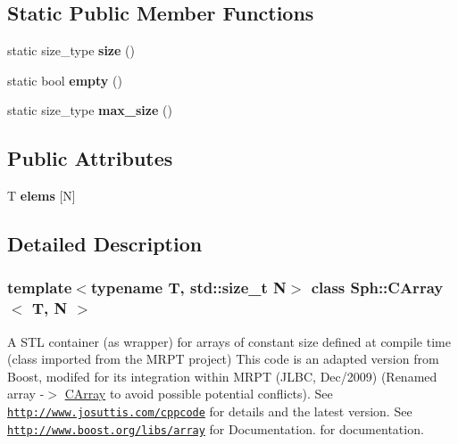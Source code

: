 \subsection*{Static Public Member Functions}
\begin{DoxyCompactItemize}
\item 
\hypertarget{classSph_1_1CArray_a03e1155a64fd175ea52366b3556e7e3d}{}\label{classSph_1_1CArray_a03e1155a64fd175ea52366b3556e7e3d} 
static size\+\_\+type {\bfseries size} ()
\item 
\hypertarget{classSph_1_1CArray_a321aeb07b35cf7aa7da72162ab9d2198}{}\label{classSph_1_1CArray_a321aeb07b35cf7aa7da72162ab9d2198} 
static bool {\bfseries empty} ()
\item 
\hypertarget{classSph_1_1CArray_af82316e045b35b616d6d585e1130c38b}{}\label{classSph_1_1CArray_af82316e045b35b616d6d585e1130c38b} 
static size\+\_\+type {\bfseries max\+\_\+size} ()
\end{DoxyCompactItemize}
\subsection*{Public Attributes}
\begin{DoxyCompactItemize}
\item 
\hypertarget{classSph_1_1CArray_a5843f925025a4873fd098667d291a51e}{}\label{classSph_1_1CArray_a5843f925025a4873fd098667d291a51e} 
T {\bfseries elems} \mbox{[}N\mbox{]}
\end{DoxyCompactItemize}


\subsection{Detailed Description}
\subsubsection*{template$<$typename T, std\+::size\+\_\+t N$>$\newline
class Sph\+::\+C\+Array$<$ T, N $>$}

A S\+TL container (as wrapper) for arrays of constant size defined at compile time (class imported from the M\+R\+PT project) This code is an adapted version from Boost, modifed for its integration within M\+R\+PT (J\+L\+BC, Dec/2009) (Renamed array -\/$>$ \hyperlink{classSph_1_1CArray}{C\+Array} to avoid possible potential conflicts). See \href{http://www.josuttis.com/cppcode}{\tt http\+://www.\+josuttis.\+com/cppcode} for details and the latest version. See \href{http://www.boost.org/libs/array}{\tt http\+://www.\+boost.\+org/libs/array} for Documentation. for documentation.

